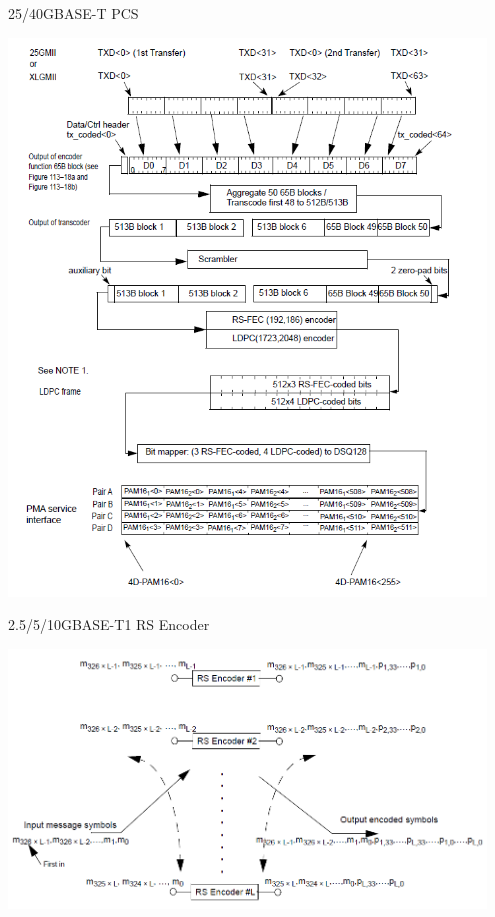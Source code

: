 \documentclass{beamer}
\begin{document}
\begin{frame}{25/40GBASE-T PCS}
	\begin{center}
        \includegraphics[width=0.95\textwidth,height=0.85\textheight,keepaspectratio]{images/25-40GBASE-T-coding.png}
    \end{center}
\end{frame}

\begin{frame}{2.5/5/10GBASE-T1 RS Encoder}
	\begin{center}
        \includegraphics[width=0.95\textwidth,height=0.85\textheight,keepaspectratio]{images/rs-interleaver.png}
    \end{center}
\end{frame}
\end{document}
